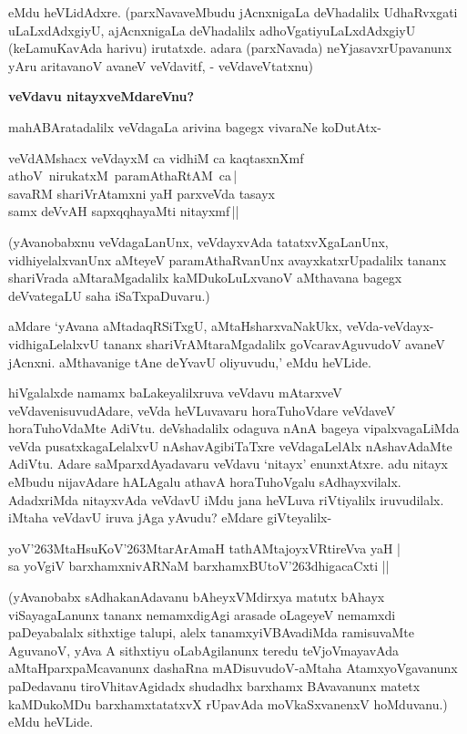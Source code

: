 \noindent
eMdu heVLidAdxre. (parxNavaveMbudu jAcnxnigaLa deVhadalilx UdhaRvxgati uLaLxdAdx\-giyU, ajAcnxnigaLa deVhadalilx adhoVgatiyuLaLxdAdxgiyU (keLamuKavAda harivu) irutatxde. adara (parxNavada) neYjasavxrUpa\-vanunx yAru aritavanoV avaneV veVdavitf, - veVdaveVtatxnu)

{\bigskip
\noindent
{\large\bf veVdavu nitayxveMdareVnu?}}\label{page133}
\medskip

\noindent
mahABAratadalilx veVdagaLa arivina bagegx vivaraNe koDutAtx-

\begin{shloka}
veVdAMshacx veVdayxM ca vidhiM ca kaqtasxnXmf \hbox{athoV nirukatxM paramAthaRtAM ca\,|}\\\label{133}
savaRM shariVrAtamxni yaH parxveVda tasayx\\
samx deVvAH sapxqqhayaMti nitayxmf\,||
\end{shloka}

\noindent
(yAvanobabxnu veVdagaLanUnx, veVdayxvAda tatatxvXgaLanUnx, vidhiyelalxvanUnx aMteyeV paramAthaR\-vanUnx avayxkatxrUpadalilx tananx shariVrada aMtaraMgadalilx kaMDukoLuLxvanoV aMthavana bagegx deVvate\-gaLU saha iSaTxpaDuvaru.) 

aMdare `yAvana aMtadaqRSiTxgU, aMtaHsharxvaNakUkx, veVda-veVdayx-vidhigaLe\-lalxvU tananx shariVrAMtaraMgadalilx goVcaravAguvudoV avaneV jAcnxni. aMthavanige tAne deYvavU oliyu\-vudu,' eMdu heVLide. 

hiVgalalxde namamx baLakeyalilxruva veVdavu mAtarxveV veVdavenisuvudAdare, veVda heVLu\-vavaru horaTuhoVdare veVdaveV horaTuhoVdaMte AdiVtu. deVshadalilx odaguva nAnA bageya vipalxvagaLiMda veVda pusatxkagaLelalxvU nAshavAgibiTaTxre veVdagaLelAlx nAshavAdaMte AdiVtu. Adare saMparx\-dAya\-davaru veVdavu `nitayx' enunxtAtxre. adu nitayx eMbudu nijavAdare hALAgalu athavA horaTu\-hoVgalu sAdhayxvilalx. AdadxriMda nitayxvAda veVdavU iMdu jana heVLuva riVtiyalilx iruvu\-dilalx. iMtaha veVdavU iruva jAga yAvudu? eMdare giVteyalilx-

\begin{shloka}
yoV\char'263MtaHsuKoV\char'263MtarArAmaH tathAMtajoyxVRtireVva yaH |\\\label{134}
sa yoVgiV barxhamxnivARNaM barxhamxBUtoV\char'263dhigacaCxti ||
\end{shloka}

\noindent
(yAvanobabx sAdhakanAdavanu bAheyxVMdirxya matutx bAhayx viSayagaLanunx tananx nemamxdigAgi ara\-sade oLageyeV nemamxdi paDeyabalalx sithxtige talupi, alelx tanamxyiVBAvadiMda ramisuvaMte AguvanoV, yAva A sithxtiyu oLabAgilanunx teredu teVjoVmayavAda aMtaHparxpaMcavanunx dashaRna mADisu\-vudoV-aMtaha AtamxyoVgavanunx paDedavanu tiroVhitavAgidadx shudadhx barxhamx BAvavanunx matetx kaMDu\-koMDu barxhamxtatatxvX rUpavAda moVkaSxvanenxV hoMduvanu.) eMdu heVLide. 

